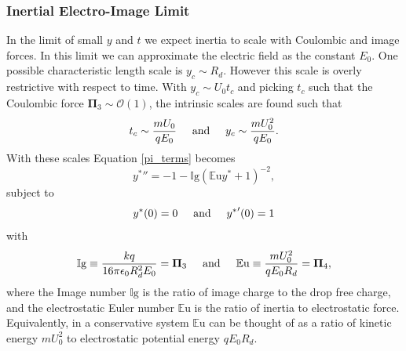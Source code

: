 \documentclass[aip,reprint, floatfix]{revtex4-1}
\begin{document}
\subsubsection{Inertial Electro-Image Limit}
In the limit of small $y$ and $t$ we expect inertia to scale with Coulombic and image forces. In this limit we can approximate the electric field as the constant $E_0$. One possible characteristic length scale is $y_c \sim R_d$. However this scale is overly restrictive with respect to time. With $y_c \sim U_0 t_c$ and picking $t_c$ such that the Coulombic force $\mathbf{\Pi}_3 \sim \mathcal{O}(1)$, the intrinsic scales are found such that
\[ t_c \sim \frac{m U_0}{q E_0} \hspace{5 mm} \mbox{and} \hspace{5 mm} 
y_c \sim \frac{m U_0^2}{q E_0} .
\]
With these scales Equation \ref{pi_terms} becomes
\begin{equation}
{y^*}'' = -1 - \mathbb{I}\mbox{g} \left( \mathbb{E}\mbox{u}{y^*} + 1 \right)^{-2} , \label{img_limit}
\end{equation}
subject to
\begin{equation*}
{y^*}(0) = 0 \hspace{5 mm} \mbox{and} \hspace{5 mm} {y^*}'(0) = 1
\end{equation*}
with 
\[ \mathbb{I}\mbox{g} \equiv \frac{k q}{16 \pi \epsilon_0 R_d^2 E_0} = \mathbf{\Pi}_3  \hspace{5 mm} \mbox{and} \hspace{5 mm}
\mathbb{E}\mbox{u} \equiv \frac{m U_0^2}{q E_0 R_d} = \mathbf{\Pi}_4 ,
\]
where the Image number $\mathbb{I}\mbox{g}$ is the ratio of image charge to the drop free charge, and the electrostatic Euler number $\mathbb{E}\mbox{u}$ is the ratio of inertia to electrostatic force. Equivalently, in a conservative system $\mathbb{E}\mbox{u}$ can be thought of as a ratio of kinetic energy $m U_0^2$ to electrostatic potential energy $q E_0 R_d$.
\end{document}
